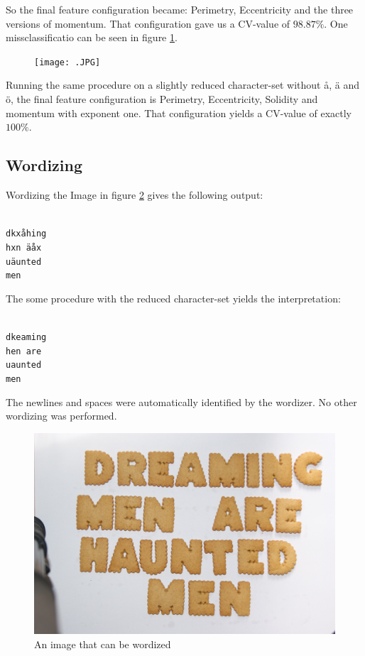 \documentclass[a4paper,11pt]{article}
\begin{document}
So the final feature configuration became: Perimetry, Eccentricity and the three versions of momentum.
That configuration gave us a CV-value of $98.87\%$.
One missclassificatio can be seen in figure \ref{fig:misclas}.

\begin{figure}[]
\begin{center}
\texttt{[image: .JPG]}
\end{center}
\caption{}
\label{fig:misclas}
\end{figure}

Running the same procedure on a slightly reduced character-set without å, ä and ö,
the final feature configuration is Perimetry, Eccentricity, Solidity and momentum with exponent one.
That configuration yields a CV-value of exactly $100\%$. 

\subsection{Wordizing}
Wordizing the Image in figure \ref{fig:dreaming} gives the following output:

\texttt{ \\
dkxåhing \\
hxn äåx \\
uäunted \\
men \\
}

The some procedure with the reduced character-set yields the interpretation:

\texttt{ \\
dkeaming \\
hen are \\
uaunted \\
men \\
}

The newlines and spaces were automatically identified by the wordizer.
No other wordizing was performed.

\begin{figure}[]
\begin{center}
\includegraphics[width=140mm]{dreaming.JPG}
\end{center}
\caption{An image that can be wordized}
\label{fig:dreaming}
\end{figure}
\end{document}
